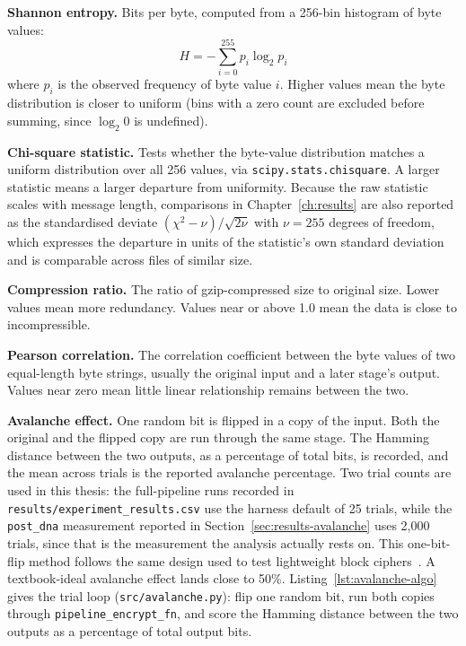 \documentclass[12pt,a4paper,twoside]{report}
\numberwithin{equation}{chapter}
\begin{document}
\textbf{Shannon entropy.} Bits per byte, computed from a 256-bin
histogram of byte values:
\begin{equation}
H = -\sum_{i=0}^{255} p_i \log_2 p_i
\label{eq:entropy}
\end{equation}
where $p_i$ is the observed frequency of byte value $i$. Higher values
mean the byte distribution is closer to uniform (bins with a zero
count are excluded before summing, since $\log_2 0$ is undefined).

\textbf{Chi-square statistic.} Tests whether the byte-value
distribution matches a uniform distribution over all 256 values, via
\texttt{scipy.stats.chisquare}. A larger statistic means a larger
departure from uniformity. Because the raw statistic scales with
message length, comparisons in Chapter~\ref{ch:results} are also
reported as the standardised deviate
$(\chi^2 - \nu)/\sqrt{2\nu}$ with $\nu = 255$ degrees of freedom, which
expresses the departure in units of the statistic's own standard
deviation and is comparable across files of similar size.

\textbf{Compression ratio.} The ratio of gzip-compressed size to
original size. Lower values mean more redundancy. Values near or above
1.0 mean the data is close to incompressible.

\textbf{Pearson correlation.} The correlation coefficient between the
byte values of two equal-length byte strings, usually the original
input and a later stage's output. Values near zero mean little linear
relationship remains between the two.

\textbf{Avalanche effect.} One random bit is flipped in a copy of the
input. Both the original and the flipped copy are run through the same
stage. The Hamming distance between the two outputs, as a percentage of
total bits, is recorded, and the mean across trials is the reported
avalanche percentage. Two trial counts are used in this thesis: the
full-pipeline runs recorded in \texttt{results/experiment\_results.csv}
use the harness default of 25 trials, while the \texttt{post\_dna}
measurement reported in Section~\ref{sec:results-avalanche} uses 2,000
trials, since that is the measurement the analysis actually rests on.
This one-bit-flip method follows the same design used to test lightweight
block ciphers~\cite{inru}. A textbook-ideal avalanche effect lands
close to 50\%. Listing~\ref{lst:avalanche-algo} gives the trial loop
(\texttt{src/avalanche.py}): flip one random bit, run both copies
through \texttt{pipeline\_encrypt\_fn}, and score the Hamming distance
between the two outputs as a percentage of total output bits.
\end{document}
